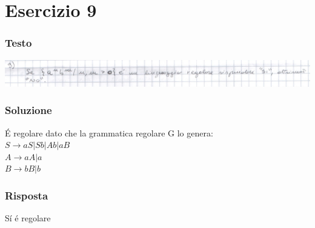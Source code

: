 \chapter{Esercizio 9}

\subsection{Testo}

\begin{center}
    \includegraphics[scale=0.2]{Chapters/Img/09text.png}\\
\end{center} 

\subsection{Soluzione}
\'E regolare dato che la grammatica regolare G lo genera:\\
$S \rightarrow aS | Sb | Ab | aB$\\
$A \rightarrow aA | a$\\
$B \rightarrow bB | b$\\

\subsection{Risposta}
S\'i \'e regolare